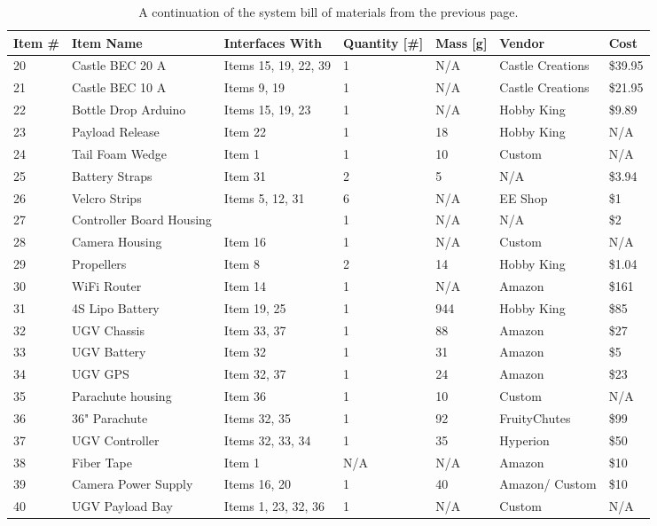 \documentclass[]{auvsi_doc}
\begin{document}
	\begin{table}[h!]
		\begin{center}
			\caption{A continuation of the system bill of materials from the previous page.}
			\label{table:BOM}
			\begin{tabular}{p{1cm}p{4cm}p{3cm}p{1.5cm}p{1cm}p{2.5cm}p{1cm}}
				\toprule
				Item \# & Item Name & Interfaces With & Quantity [\#] & Mass [g] & Vendor & Cost \\
				\midrule
				20 & Castle BEC 20 A & Items 15, 19, 22, 39 & 1 & N/A & Castle \newline Creations & \$39.95 \\
				21 & Castle BEC 10 A & Items 9, 19 & 1 & N/A & Castle \newline Creations & \$21.95 \\
				22 & Bottle Drop Arduino & Items 15, 19, 23 & 1 & N/A & Hobby King & \$9.89 \\
				23 & Payload Release & Item 22 & 1 & 18 & Hobby King & N/A \\
				24 & Tail Foam Wedge & Item 1 & 1 & 10 & Custom & N/A \\
				25 & Battery Straps & Item 31 & 2 & 5 & N/A & \$3.94 \\
				26 & Velcro Strips & Items 5, 12, 31 & 6 & N/A & EE Shop & \$1  \\
				27 & Controller Board \newline Housing &   & 1 & N/A & N/A & \$2 \\
				28 & Camera Housing & Item 16 & 1 & N/A & Custom & N/A \\
				29 & Propellers & Item 8 & 2 & 14 & Hobby King & \$1.04 \\
				30 & WiFi Router & Item 14 & 1 & N/A & Amazon & \$161
				 \\
				31 & 4S Lipo Battery & Item 19, 25 & 1 & 944 & Hobby King & \$85 \\
				32 & UGV Chassis & Item 33, 37 & 1 & 88 & Amazon & \$27 \\
				33 & UGV Battery & Item 32 & 1 & 31 & Amazon & \$5  \\
				34 & UGV GPS & Item 32, 37 & 1 & 24 & Amazon & \$23 \\
				35 & Parachute housing & Item 36 & 1 & 10 & Custom & N/A \\
				36 & 36" Parachute & Items 32, 35 & 1 & 92 & FruityChutes & \$99 \\
				37 & UGV Controller & Items 32, 33, 34 & 1 & 35 & Hyperion & \$50 \\
				38 & Fiber Tape & Item 1 & N/A & N/A & Amazon & \$10 \\
				39 & Camera Power Supply & Items 16, 20 & 1 & 40 & Amazon/ \newline Custom & \$10 \\
				40 & UGV Payload Bay & Items 1, 23, 32, 36 & 1 & N/A & Custom & N/A \\

				\bottomrule
			\end{tabular}
		\end{center}
	\end{table}
\end{document}
